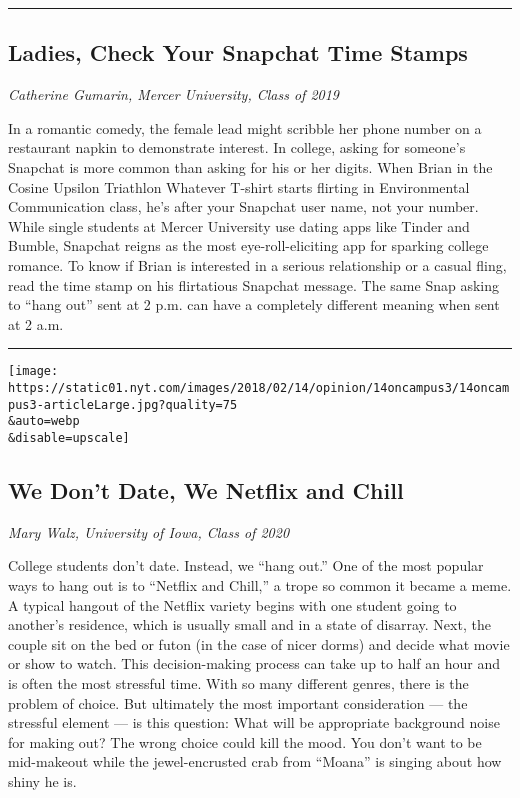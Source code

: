 \begin{center}\rule{0.5\linewidth}{\linethickness}\end{center}

\hypertarget{ladies-check-your-snapchat-time-stamps}{%
\subsection{Ladies, Check Your Snapchat Time
Stamps}\label{ladies-check-your-snapchat-time-stamps}}

\emph{Catherine Gumarin, Mercer University, Class of 2019}

In a romantic comedy, the female lead might scribble her phone number on
a restaurant napkin to demonstrate interest. In college, asking for
someone's Snapchat is more common than asking for his or her digits.
When Brian in the Cosine Upsilon Triathlon Whatever T-shirt starts
flirting in Environmental Communication class, he's after your Snapchat
user name, not your number. While single students at Mercer University
use dating apps like Tinder and Bumble, Snapchat reigns as the most
eye-roll-eliciting app for sparking college romance. To know if Brian is
interested in a serious relationship or a casual fling, read the time
stamp on his flirtatious Snapchat message. The same Snap asking to
``hang out'' sent at 2 p.m. can have a completely different meaning when
sent at 2 a.m.

\begin{center}\rule{0.5\linewidth}{\linethickness}\end{center}

\texttt{[image: https://static01.nyt.com/images/2018/02/14/opinion/14oncampus3/14oncampus3-articleLarge.jpg?quality=75\\\&auto=webp\\\&disable=upscale]}

\hypertarget{we-dont-date-we-netflix-and-chill}{%
\subsection{We Don't Date, We Netflix and
Chill}\label{we-dont-date-we-netflix-and-chill}}

\emph{Mary Walz, University of Iowa, Class of 2020}

College students don't date. Instead, we ``hang out.'' One of the most
popular ways to hang out is to ``Netflix and Chill,'' a trope so common
it became a meme. A typical hangout of the Netflix variety begins with
one student going to another's residence, which is usually small and in
a state of disarray. Next, the couple sit on the bed or futon (in the
case of nicer dorms) and decide what movie or show to watch. This
decision-making process can take up to half an hour and is often the
most stressful time. With so many different genres, there is the problem
of choice. But ultimately the most important consideration --- the
stressful element --- is this question: What will be appropriate
background noise for making out? The wrong choice could kill the mood.
You don't want to be mid-makeout while the jewel-encrusted crab from
``Moana'' is singing about how shiny he is.

